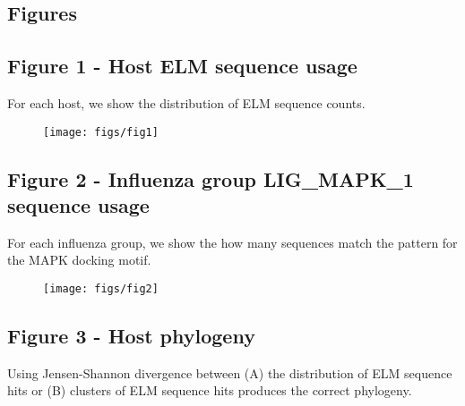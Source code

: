 \documentclass[10pt]{bmc_article}
\newenvironment{bmcformat}{\begin{raggedright}\baselineskip20pt\sloppy\setboolean{publ}{false}}{\end{raggedright}\baselineskip20pt\sloppy}
\begin{document}
\begin{bmcformat}
   




\section*{Figures}
  \subsection*{Figure 1 - Host ELM sequence usage}
      For each host, we show the distribution of ELM sequence counts.

      \begin{figure}
      \begin{center}
      \texttt{[image: figs/fig1]}
      \end{center}
      \end{figure}

  \subsection*{Figure 2 - Influenza group LIG\_MAPK\_1 sequence usage}
     For each influenza group, we show the how many sequences match
     the pattern for the MAPK docking motif.

     \begin{figure}
      \begin{center}
      \texttt{[image: figs/fig2]}
      \end{center}
      \end{figure}

  \subsection*{Figure 3 - Host phylogeny}
     Using Jensen-Shannon divergence between (A) the distribution of
     ELM sequence hits or (B) clusters of ELM sequence hits produces
     the correct phylogeny.


\end{bmcformat}
\end{document}
